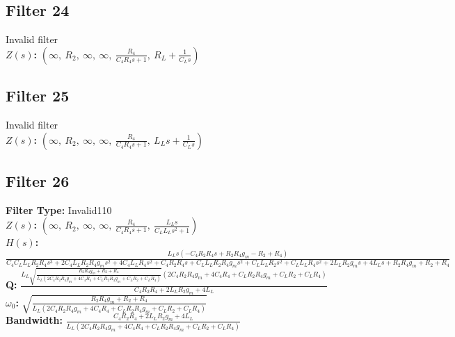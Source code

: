 \documentclass{article}
\begin{document}
\subsection*{Filter 24}
Invalid filter \\ 
\textbf{$Z(s)$:} $\left( \infty, \  R_{2}, \  \infty, \  \infty, \  \frac{R_{4}}{C_{4} R_{4} s + 1}, \  R_{L} + \frac{1}{C_{L} s}\right)$ \\ 
\subsection*{Filter 25}
Invalid filter \\ 
\textbf{$Z(s)$:} $\left( \infty, \  R_{2}, \  \infty, \  \infty, \  \frac{R_{4}}{C_{4} R_{4} s + 1}, \  L_{L} s + \frac{1}{C_{L} s}\right)$ \\ 
\subsection*{Filter 26}
\textbf{Filter Type:} Invalid110 \\ 
\textbf{$Z(s)$:} $\left( \infty, \  R_{2}, \  \infty, \  \infty, \  \frac{R_{4}}{C_{4} R_{4} s + 1}, \  \frac{L_{L} s}{C_{L} L_{L} s^{2} + 1}\right)$ \\ 
\textbf{$H(s)$:} $\frac{L_{L} s \left(- C_{4} R_{2} R_{4} s + R_{2} R_{4} g_{m} - R_{2} + R_{4}\right)}{C_{4} C_{L} L_{L} R_{2} R_{4} s^{3} + 2 C_{4} L_{L} R_{2} R_{4} g_{m} s^{2} + 4 C_{4} L_{L} R_{4} s^{2} + C_{4} R_{2} R_{4} s + C_{L} L_{L} R_{2} R_{4} g_{m} s^{2} + C_{L} L_{L} R_{2} s^{2} + C_{L} L_{L} R_{4} s^{2} + 2 L_{L} R_{2} g_{m} s + 4 L_{L} s + R_{2} R_{4} g_{m} + R_{2} + R_{4}}$ \\ 
\textbf{Q:} $\frac{L_{L} \sqrt{\frac{R_{2} R_{4} g_{m} + R_{2} + R_{4}}{L_{L} \left(2 C_{4} R_{2} R_{4} g_{m} + 4 C_{4} R_{4} + C_{L} R_{2} R_{4} g_{m} + C_{L} R_{2} + C_{L} R_{4}\right)}} \left(2 C_{4} R_{2} R_{4} g_{m} + 4 C_{4} R_{4} + C_{L} R_{2} R_{4} g_{m} + C_{L} R_{2} + C_{L} R_{4}\right)}{C_{4} R_{2} R_{4} + 2 L_{L} R_{2} g_{m} + 4 L_{L}}$ \\ 
\textbf{$\omega_0$:} $\sqrt{\frac{R_{2} R_{4} g_{m} + R_{2} + R_{4}}{L_{L} \left(2 C_{4} R_{2} R_{4} g_{m} + 4 C_{4} R_{4} + C_{L} R_{2} R_{4} g_{m} + C_{L} R_{2} + C_{L} R_{4}\right)}}$ \\ 
\textbf{Bandwidth:} $\frac{C_{4} R_{2} R_{4} + 2 L_{L} R_{2} g_{m} + 4 L_{L}}{L_{L} \left(2 C_{4} R_{2} R_{4} g_{m} + 4 C_{4} R_{4} + C_{L} R_{2} R_{4} g_{m} + C_{L} R_{2} + C_{L} R_{4}\right)}$ \\ 
\end{document}
